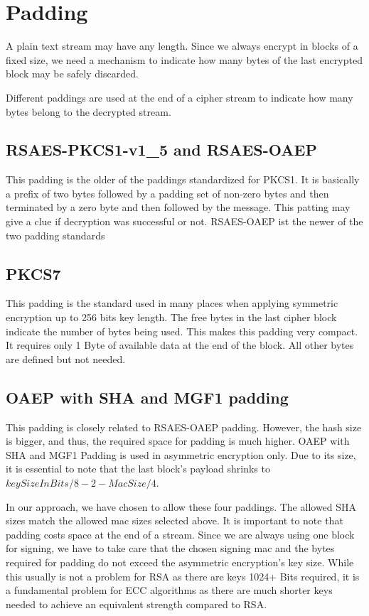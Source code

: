\section{Padding}
A plain text stream may have any length. Since we always encrypt in blocks of a fixed size, we need a mechanism to indicate how many bytes of the last encrypted block may be safely discarded. 

Different paddings are used at the end of a cipher stream to indicate how many bytes belong to the decrypted stream.

\subsection{RSAES-PKCS1-v1\_5 and RSAES-OAEP}
This padding is the older of the paddings standardized for PKCS1. It is basically a prefix of two bytes followed by a padding set of non-zero bytes and then terminated by a zero byte and then followed by the message. This patting may give a clue if decryption was successful or not. RSAES-OAEP ist the newer of the two padding standards 

\subsection{PKCS7} 
This padding is the standard used in many places when applying symmetric encryption up to 256 bits key length. The free bytes in the last cipher block indicate the number of bytes being used. This makes this padding very compact. It requires only 1 Byte of available data at the end of the block. All other bytes are defined but not needed.

\subsection{OAEP with SHA and MGF1 padding} 
This padding is closely related to RSAES-OAEP padding. However, the hash size is bigger, and thus, the required space for padding is much higher. OAEP with SHA and MGF1 Padding is used in asymmetric encryption only. Due to its size, it is essential to note that the last block's payload shrinks to $keySizeInBits/8-2-MacSize/4$.

In our approach, we have chosen to allow these four paddings. The allowed SHA sizes match the allowed mac sizes selected above. It is important to note that padding costs space at the end of a stream. Since we are always using one block for signing, we have to take care that the chosen signing mac and the bytes required for padding do not exceed the asymmetric encryption's key size. While this usually is not a problem for RSA as there are keys 1024+ Bits required, it is a fundamental problem for ECC algorithms as there are much shorter keys needed to achieve an equivalent strength compared to RSA. 

